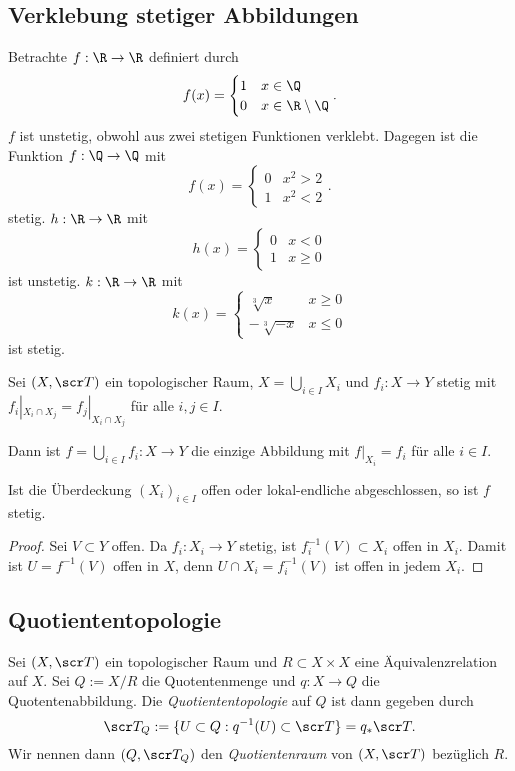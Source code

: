 \subsection{Verklebung stetiger Abbildungen}

Betrachte $f: \R \to \R$ definiert durch
\[
	f(x) = \begin{cases}
		1 & x \in \Q \\
		0 & x \in \R \setminus \Q
	\end{cases}.
\]
$f$ ist unstetig, obwohl aus zwei stetigen Funktionen verklebt.
Dagegen ist die Funktion $f: \Q \to \Q$ mit
\[
	f(x) = \begin{cases}
		0 & x^2 > 2 \\
		1 & x^2 < 2
	\end{cases}.
\]
stetig.
$h : \R \to \R$ mit
\[
	h(x) = \begin{cases}
		0 & x < 0 \\
		1 & x \ge 0
	\end{cases}
\]
ist unstetig.
$k : \R \to \R$ mit
\[
	k(x) = \begin{cases}
		\sqrt[3]{x} & x \ge 0 \\
		-\sqrt[3]{-x} & x \le 0
	\end{cases}
\]
ist stetig.

\begin{st}
	Sei $(X, \scr T)$ ein topologischer Raum, $X = \bigcup_{i \in I} X_i$ und $f_i: X \to Y$ stetig mit $f_i|_{X_i \cap X_j} = f_j|_{X_i \cap X_j}$ für alle $i,j \in I$.

	Dann ist $f = \bigcup_{i \in I} f_i : X \to Y$ die einzige Abbildung mit $f|_{X_i} = f_i$ für alle $i \in I$.

	Ist die Überdeckung $(X_i)_{i\in I}$ offen oder lokal-endliche abgeschlossen, so ist $f$ stetig.
	\begin{proof}
		Sei $V \subset Y$ offen.
		Da $f_i : X_i \to Y$ stetig, ist $f_i^{-1}(V) \subset X_i$ offen in $X_i$.
		Damit ist $U = f^{-1}(V)$ offen in $X$, denn $U \cap X_i = f_i^{-1}(V)$ ist offen in jedem $X_i$.
	\end{proof}
\end{st}

\subsection{Quotiententopologie}

\begin{df}
	Sei $(X, \scr T)$ ein topologischer Raum und $R \subset X \times X$ eine Äquivalenzrelation auf $X$.
	Sei $Q := X / R$ die Quotentenmenge und $q: X \to Q$ die Quotentenabbildung.
	Die \emph{Quotiententopologie} auf $Q$ ist dann gegeben durch
	\[
		\scr T_Q
		:= \{ U \subset Q : q^{-1}(U) \subset \scr T \}
		= q_* \scr T.
	\]
	Wir nennen dann $(Q, \scr T_Q)$ den \emph{Quotientenraum} von $(X, \scr T)$ bezüglich $R$.
\end{df}

